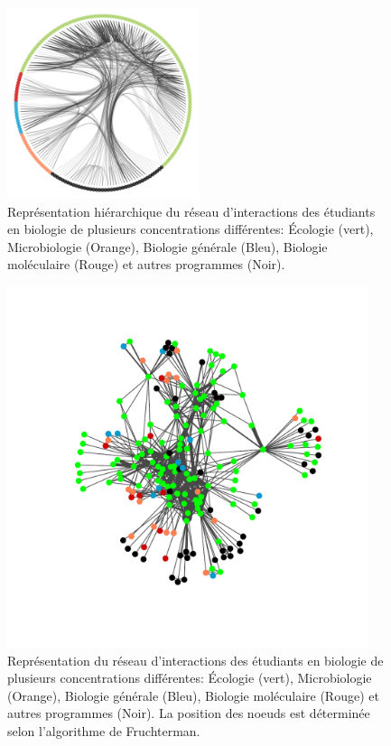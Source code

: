 \documentclass[letterpaper,twocolumn,showkeys, 12pt]{article}
\begin{document}
\begin{figure}[h]
    \centering
    \includegraphics[width=0.5\textwidth]{Figure 2.pdf}
    \caption{Représentation hiérarchique du réseau d'interactions des étudiants en biologie de plusieurs concentrations différentes: Écologie (vert), Microbiologie (Orange), Biologie générale (Bleu), Biologie moléculaire (Rouge) et autres programmes (Noir).}
    \label{fig:barplot1}
\end{figure}


\begin{figure}[h]
    \centering
    \includegraphics[width=400,trim={20mm 20mm 20mm 20mm},clip]{Figure 4.pdf}
    \caption{Représentation du réseau d'interactions des étudiants en biologie de plusieurs concentrations différentes: Écologie (vert), Microbiologie (Orange), Biologie générale (Bleu), Biologie moléculaire (Rouge) et autres programmes (Noir). La position des noeuds est déterminée selon l'algorithme de Fruchterman.}
    \label{fig:barplot1}
\end{figure}
\end{document}
